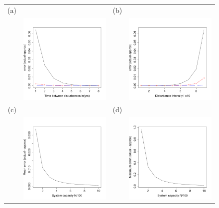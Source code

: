  \begin{figure}[th]
\centering
   \begin{tabular}{rrrr}
   (a)&&(b)&\\
  &\includegraphics[width=2.5in]{errwithTlb.pdf} && \includegraphics[width=2.5in]{errwithIlb.pdf} \\
  (c)&&(d)&\\
  &\includegraphics[width=2.5in]{meanerrorovermatrix.pdf} && \includegraphics[width=2.5in]{maxerrorovermatrix.pdf} \end{tabular}

\end{figure}
